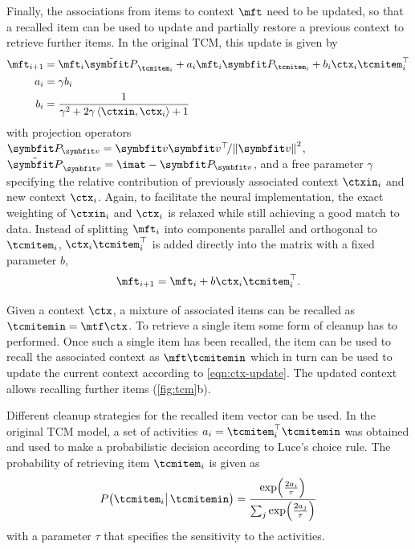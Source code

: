 Finally, the associations from items to context $\mft$ need to be updated, so that a recalled item can be used to update and partially restore a previous context to retrieve further items.
In the original TCM, this update is given by
\begin{align}
    \mft_{i+1} &= \mft_i \tilde{\mat{P}}_{\tcmitem_i} + a_i \mft_i \mat{P}_{\tcmitem_i} + b_i \ctx_i \tcmitem_i\Tr \\
    a_i &= \gamma b_i \\
    b_i &= \frac{1}{\gamma^2 + 2 \gamma \left\langle\ctxin, \ctx_i\right\rangle + 1}
\end{align}
with projection operators $\mat{P}_{\vc v} = \vc v \vc v\Tr\!/ \norm{\vc v}^2$, $\tilde{\mat{P}}_{\vc v} = \imat - \mat{P}_{\vc v}$, and a free parameter $\gamma$ specifying the relative contribution of previously associated context $\ctxin_i$ and new context $\ctx_i$.
Again, to facilitate the neural implementation, the exact weighting of $\ctxin_i$ and $\ctx_i$ is relaxed while still achieving a good match to data.
Instead of splitting $\mft_i$ into components parallel and orthogonal to $\tcmitem_i$, $\ctx_i\tcmitem_i\Tr$ is added directly into the matrix with a fixed parameter $b$,
\begin{equation}
    \mft_{i+1} = \mft_i + b \ctx_i\tcmitem_i\Tr\text{.}
\end{equation}

Given a context $\ctx$, a mixture of associated items can be recalled as $\tcmitemin = \mtf \ctx$.
To retrieve a single item some form of cleanup has to performed.
Once such a single item has been recalled, the item can be used to recall the associated context as $\mft \tcmitemin$ which in turn can be used to update the current context according to \cref{eqn:ctx-update}.
The updated context allows recalling further items (\cref{fig:tcm}b).

Different cleanup strategies for the recalled item vector can be used.
In the original TCM model, a set of activities $a_i = \tcmitem_i\Tr \tcmitemin$ was obtained and used to make a probabilistic decision according to Luce's choice rule.
The probability of retrieving item $\tcmitem_i$ is given as
\begin{equation}
    P\bigl(\tcmitem_i \bigl|\,\tcmitemin\bigr) = \frac{\exp\!\del{\frac{2a_i}{\tau}}}{\sum_j \exp\!\del{\frac{2a_j}{\tau}}}
\end{equation}
with a parameter $\tau$ that specifies the sensitivity to the activities.

